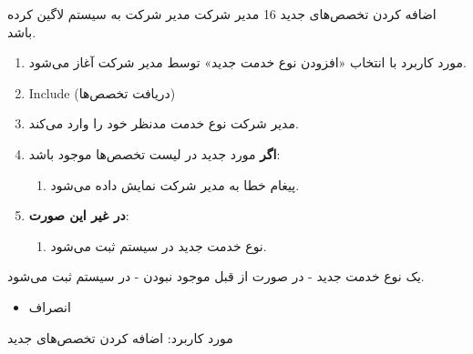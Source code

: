 {
	\usecase
	{اضافه کردن تخصص‌های جدید}
	{16}
	{}
	{مدیر شرکت}
	{}
	{مدیر شرکت به سیستم لاگین کرده باشد.}
	{
		\vspace*{-0.6cm}
		\begin{enumerate}
			\item 
			مورد کاربرد با انتخاب «افزودن نوع خدمت جدید» توسط مدیر شرکت آغاز می‌شود.
			\item Include (دریافت تخصص‌ها)
			\item مدیر شرکت نوع خدمت مدنظر خود را وارد می‌کند. 
			\item
			\textbf{اگر}
			مورد جدید در لیست تخصص‌ها موجود باشد:
			\begin{enumerate}[label=\theenumi.\arabic*.]
				\item پیغام خطا به مدیر شرکت نمایش داده می‌شود.
			\end{enumerate}
			\item
			\textbf{در غیر این صورت}:
			\begin{enumerate}[label=\theenumi.\arabic*.]
				\item نوع خدمت جدید در سیستم ثبت می‌شود.
			\end{enumerate}		
		\end{enumerate}
	}
	{یک نوع خدمت جدید - در صورت از قبل موجود نبودن - در سیستم ثبت می‌شود.}
	{
		\begin{itemize}
			\vspace*{-0.6cm}
			\item انصراف
		\end{itemize}
	}
	{
		مورد کاربرد: اضافه کردن تخصص‌های جدید 
	}
	
}


